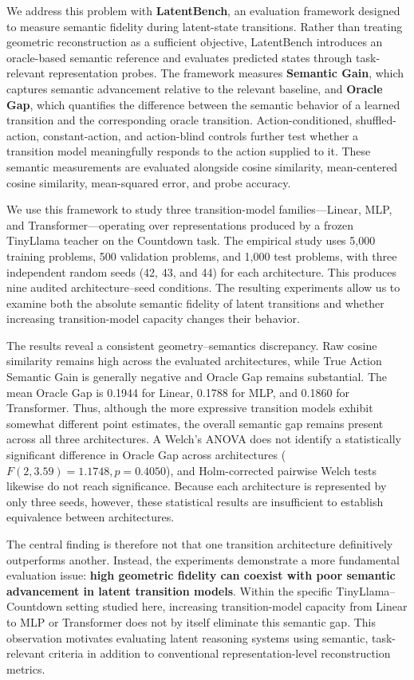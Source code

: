 \documentclass[conference]{IEEEtran}
\begin{document}
We address this problem with \textbf{LatentBench}, an evaluation framework designed to measure semantic fidelity during latent-state transitions. Rather than treating geometric reconstruction as a sufficient objective, LatentBench introduces an oracle-based semantic reference and evaluates predicted states through task-relevant representation probes. The framework measures \textbf{Semantic Gain}, which captures semantic advancement relative to the relevant baseline, and \textbf{Oracle Gap}, which quantifies the difference between the semantic behavior of a learned transition and the corresponding oracle transition. Action-conditioned, shuffled-action, constant-action, and action-blind controls further test whether a transition model meaningfully responds to the action supplied to it. These semantic measurements are evaluated alongside cosine similarity, mean-centered cosine similarity, mean-squared error, and probe accuracy.

We use this framework to study three transition-model families---Linear, MLP, and Transformer---operating over representations produced by a frozen TinyLlama teacher on the Countdown task. The empirical study uses 5,000 training problems, 500 validation problems, and 1,000 test problems, with three independent random seeds (42, 43, and 44) for each architecture. This produces nine audited architecture--seed conditions. The resulting experiments allow us to examine both the absolute semantic fidelity of latent transitions and whether increasing transition-model capacity changes their behavior.

The results reveal a consistent geometry--semantics discrepancy. Raw cosine similarity remains high across the evaluated architectures, while True Action Semantic Gain is generally negative and Oracle Gap remains substantial. The mean Oracle Gap is 0.1944 for Linear, 0.1788 for MLP, and 0.1860 for Transformer. Thus, although the more expressive transition models exhibit somewhat different point estimates, the overall semantic gap remains present across all three architectures. A Welch's ANOVA does not identify a statistically significant difference in Oracle Gap across architectures ($F(2,3.59)=1.1748, p=0.4050$), and Holm-corrected pairwise Welch tests likewise do not reach significance. Because each architecture is represented by only three seeds, however, these statistical results are insufficient to establish equivalence between architectures.

The central finding is therefore not that one transition architecture definitively outperforms another. Instead, the experiments demonstrate a more fundamental evaluation issue: \textbf{high geometric fidelity can coexist with poor semantic advancement in latent transition models}. Within the specific TinyLlama--Countdown setting studied here, increasing transition-model capacity from Linear to MLP or Transformer does not by itself eliminate this semantic gap. This observation motivates evaluating latent reasoning systems using semantic, task-relevant criteria in addition to conventional representation-level reconstruction metrics.
\end{document}
